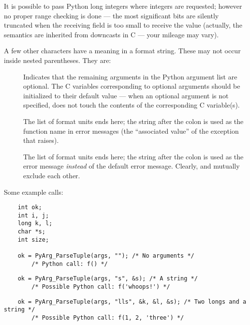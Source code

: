 \documentclass{manual}
\begin{document}
It is possible to pass Python long integers where integers are
requested; however no proper range checking is done --- the most
significant bits are silently truncated when the receiving field is
too small to receive the value (actually, the semantics are inherited
from downcasts in C --- your mileage may vary).

A few other characters have a meaning in a format string.  These may
not occur inside nested parentheses.  They are:

\begin{description}

\item[\samp{|}]
Indicates that the remaining arguments in the Python argument list are
optional.  The C variables corresponding to optional arguments should
be initialized to their default value --- when an optional argument is
not specified,  does not touch the contents
of the corresponding C variable(s).

\item[\samp{:}]
The list of format units ends here; the string after the colon is used
as the function name in error messages (the ``associated value'' of
the exception that  raises).

\item[\samp{;}]
The list of format units ends here; the string after the colon is used
as the error message \emph{instead} of the default error message.
Clearly, \samp{:} and \samp{;} mutually exclude each other.

\end{description}

Some example calls:

\begin{verbatim}
    int ok;
    int i, j;
    long k, l;
    char *s;
    int size;

    ok = PyArg_ParseTuple(args, ""); /* No arguments */
        /* Python call: f() */
\end{verbatim}

\begin{verbatim}
    ok = PyArg_ParseTuple(args, "s", &s); /* A string */
        /* Possible Python call: f('whoops!') */
\end{verbatim}

\begin{verbatim}
    ok = PyArg_ParseTuple(args, "lls", &k, &l, &s); /* Two longs and a string */
        /* Possible Python call: f(1, 2, 'three') */
\end{verbatim}
\end{document}
